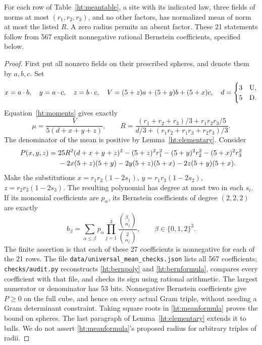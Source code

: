 \begin{htlem}\label{ht:meanbern}
For each row of Table~\ref{ht:meantable}, a site with its indicated law,
three fields of norms at most \((r_1,r_2,r_3)\), and no other factors,
has normalized mean of norm at most the listed \(R\). A zero radius
permits an absent factor. These 21 statements follow from 567 explicit
nonnegative rational Bernstein coefficients, specified below.
\end{htlem}
\begin{proof}
First put all nonzero fields on their prescribed spheres, and denote
them by \(a,b,c\). Set
\[
 x=a\cdot b,\quad y=a\cdot c,\quad z=b\cdot c,\quad
 V=(5+z)a+(5+y)b+(5+x)c,\quad
 d=\begin{cases}3&\mathrm U,\\5&\mathrm D.\end{cases}
\]
Equation~\eqref{ht:moments} gives exactly
\begin{equation}\label{ht:meanformula}
 \mu=\frac{V}{5(d+x+y+z)},\qquad
 R=\frac{(r_1+r_2+r_3)/3+r_1r_2r_3/5}
 {d/3+(r_1r_2+r_1r_3+r_2r_3)/3}.
\end{equation}
The denominator of the mean is positive by Lemma~\ref{ht:elementary}.
Consider
\begin{align}\label{ht:bernpoly}
 P(x,y,z)={}&25R^2(d+x+y+z)^2
  -(5+z)^2r_1^2-(5+y)^2r_2^2-(5+x)^2r_3^2\notag\\
 &-2x(5+z)(5+y)-2y(5+z)(5+x)-2z(5+y)(5+x).
\end{align}
Make the substitutions
\(x=r_1r_2(1-2s_1)\), \(y=r_1r_3(1-2s_2)\),
\(z=r_2r_3(1-2s_3)\). The resulting polynomial has degree at most two
in each \(s_i\). If its monomial coefficients are \(p_\alpha\), its
Bernstein coefficients of degree \((2,2,2)\) are exactly
\begin{equation}\label{ht:bernformula}
 b_\beta=\sum_{\alpha\le\beta}p_\alpha
           \prod_{j=1}^3\frac{\binom{\beta_j}{\alpha_j}}
                                 {\binom2{\alpha_j}},
 \qquad \beta\in\{0,1,2\}^3.
\end{equation}
The finite assertion is that each of these 27 coefficients is
nonnegative for each of the 21 rows. The file
\texttt{data/\allowbreak universal\_mean\_checks.json} lists all 567 coefficients;
\texttt{checks/audit.py} reconstructs \eqref{ht:bernpoly} and
\eqref{ht:bernformula}, compares every coefficient with that file, and
checks its sign using rational arithmetic. The largest numerator or
denominator has 53 bits. Nonnegative Bernstein coefficients give
\(P\ge0\) on the full cube, and hence on every actual Gram triple,
without needing a Gram determinant constraint. Taking square roots
in \eqref{ht:meanformula} proves the bound on spheres. The last paragraph
of Lemma~\ref{ht:elementary} extends it to balls. We do not assert
\eqref{ht:meanformula}'s proposed radius for arbitrary triples of radii.
\end{proof}
